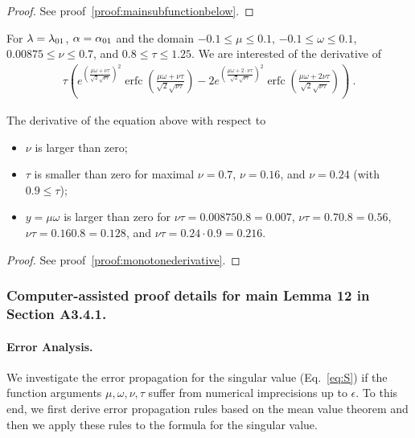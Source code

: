 \documentclass{article}
\renewcommand{\leq}{\leqslant}
\DeclareMathOperator{\erfc}{erfc}
\begin{document}
\begin{proof}
See proof~\ref{proof:mainsubfunctionbelow}.
\end{proof}



\begin{lemma}
\label{th:s2monotone}
For $\lambda=\lambda_{\rm 01}$, $\alpha=\alpha_{\rm 01}$
and the domain 
$-0.1 \leq \mu \leq 0.1$, 
$-0.1 \leq \omega \leq 0.1$,
$0.00875 \leq \nu \leq 0.7$, and 
$0.8 \leq \tau \leq 1.25$.
We are interested of the derivative of
\begin{align} 
\label{eq:subx1Th}
\tau \left(e^{\left(\frac{\mu \omega+\nu \tau}{\sqrt{2} \sqrt{\nu \tau}}\right)^2} \erfc \left(\frac{\mu \omega+\nu \tau}{\sqrt{2} \sqrt{\nu \tau}}\right)-2 e^{\left(\frac{\mu \omega+2 \cdot \nu \tau}{\sqrt{2} \sqrt{\nu \tau}}\right)^2} \erfc \left(\frac{\mu \omega+2  \nu \tau}{\sqrt{2} \sqrt{\nu \tau}}\right)\right)\ . 
\end{align}

The derivative of the equation above with
respect to
\begin{itemize}
\item $\nu$ is larger than zero;
\item $\tau$ is smaller than zero for maximal
$\nu=0.7$, $\nu=0.16$, and $\nu=0.24$ (with
$0.9 \leq \tau$);
\item $y=\mu \omega$ is larger than zero for $\nu
\tau=0.00875  0.8=0.007$, $\nu
\tau=0.7  0.8=0.56$, $\nu
\tau=0.16  0.8=0.128$, and $\nu
\tau=0.24 \cdot 0.9=0.216$.
\end{itemize}

\end{lemma}

\begin{proof}
See proof~\ref{proof:monotonederivative}.
\end{proof}













\subsubsection{Computer-assisted proof details for main Lemma 12 in Section A3.4.1.}
\label{sec:error}

\paragraph{Error Analysis.} We investigate the error propagation for the 
singular value (Eq.~\eqref{eq:S}) if the function arguments $\mu, \omega, \nu, \tau$
suffer from numerical imprecisions up to $\epsilon$. To this end, we first 
derive error propagation rules based on the mean value theorem and then 
we apply these rules to the formula for the singular value.
\end{document}
